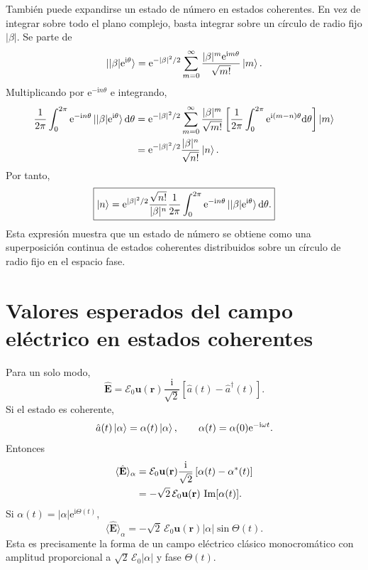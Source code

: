 \documentclass[11pt]{article}
\newcommand{\ii}{\mathrm{i}}
\newcommand{\ee}{\mathrm{e}}
\newcommand{\dd}{\mathrm{d}}
\newcommand{\vb}[1]{\mathbf{#1}}
\newcommand{\adag}{\hat a^\dagger}
\newcommand{\Ezero}{\mathcal E_0}
\newcommand{\Imag}{\operatorname{Im}}
\begin{document}
Tambi\'en puede expandirse un estado de n\'umero en estados coherentes. En
vez de integrar sobre todo el plano complejo, basta integrar sobre un c\'irculo
de radio fijo $|\beta|$. Se parte de
\begin{equation}
  \ket{|\beta|\ee^{\ii\theta}}
  =
  \ee^{-|\beta|^2/2}
  \sum_{m=0}^{\infty}
  \frac{|\beta|^m\ee^{\ii m\theta}}{\sqrt{m!}}\ket m.
\end{equation}
Multiplicando por $\ee^{-\ii n\theta}$ e integrando,
\begin{align}
  \frac1{2\pi}\int_0^{2\pi}
  \ee^{-\ii n\theta}\ket{|\beta|\ee^{\ii\theta}}\dd\theta
  &=
  \ee^{-|\beta|^2/2}
  \sum_{m=0}^{\infty}
  \frac{|\beta|^m}{\sqrt{m!}}
  \left[
  \frac1{2\pi}
  \int_0^{2\pi}\ee^{\ii(m-n)\theta}\dd\theta
  \right]\ket m \notag\\
  &=
  \ee^{-|\beta|^2/2}
  \frac{|\beta|^n}{\sqrt{n!}}\ket n.
\end{align}
Por tanto,
\begin{equation}
  \boxed{
  \ket n
  =
  \ee^{|\beta|^2/2}
  \frac{\sqrt{n!}}{|\beta|^n}
  \frac1{2\pi}
  \int_0^{2\pi}
  \ee^{-\ii n\theta}\ket{|\beta|\ee^{\ii\theta}}\dd\theta.
  }
\end{equation}
Esta expresi\'on muestra que un estado de n\'umero se obtiene como una
superposici\'on continua de estados coherentes distribuidos sobre un c\'irculo
de radio fijo en el espacio fase.

\section{Valores esperados del campo el\'ectrico en estados coherentes}

Para un solo modo,
\begin{equation}
  \hat{\vb E}
  =
  \Ezero\vb u(\vb r)\frac{\ii}{\sqrt2}
  \left[\hat a(t)-\adag(t)\right].
\end{equation}
Si el estado es coherente,
\begin{equation}
  \hat a(t)\ket\alpha=\alpha(t)\ket\alpha,
  \qquad
  \alpha(t)=\alpha(0)\ee^{-\ii\omega t}.
\end{equation}
Entonces
\begin{align}
  \langle\hat{\vb E}\rangle_\alpha
  &=
  \Ezero\vb u(\vb r)\frac{\ii}{\sqrt2}
  \left[
  \alpha(t)-\alpha^*(t)
  \right] \notag\\
  &=
  -\sqrt2\,\Ezero\vb u(\vb r)\,\Imag[\alpha(t)].
\end{align}
Si $\alpha(t)=|\alpha|\ee^{\ii\Theta(t)}$,
\begin{equation}
  \boxed{
  \langle\hat{\vb E}\rangle_\alpha
  =
  -\sqrt2\,\Ezero\vb u(\vb r)|\alpha|\sin\Theta(t).
  }
\end{equation}
Esta es precisamente la forma de un campo el\'ectrico cl\'asico
monocrom\'atico con amplitud proporcional a $\sqrt2\,\Ezero|\alpha|$ y fase
$\Theta(t)$.
\end{document}
